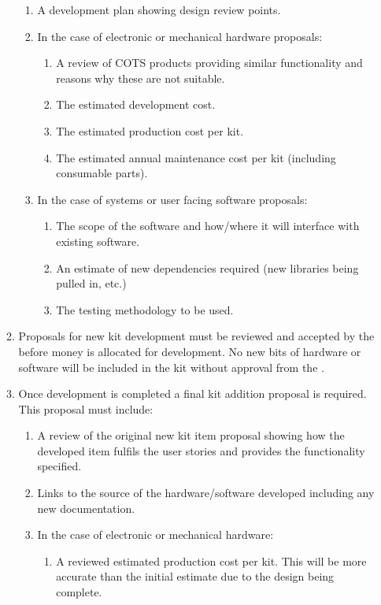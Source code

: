 \begin{enumerate}
\begin{enumerate}
\begin{enumerate}
        \item A development plan showing design review points.
        \item In the case of electronic or mechanical hardware proposals:
          \begin{enumerate}
            \item A review of COTS products providing similar functionality and reasons why these are not suitable.
            \item The estimated development cost.
            \item The estimated production cost per kit.
            \item The estimated annual maintenance cost per kit (including consumable parts).
          \end{enumerate}
        \item In the case of systems or user facing software proposals:
          \begin{enumerate}
            \item The scope of the software and how/where it will interface with existing software.
            \item An estimate of new dependencies required (new libraries being pulled in, etc.)
            \item The testing methodology to be used.
          \end{enumerate}
      \end{enumerate}
    \item Proposals for new kit development must be reviewed and accepted by the  before money is allocated for development. No new bits of hardware or software will be included in the kit without approval from the .
    \item Once development is completed a final kit addition proposal is required. This proposal must include:
      \begin{enumerate}
        \item A review of the original new kit item proposal showing how the developed item fulfils the user stories and provides the functionality specified.
        \item Links to the source of the hardware/software developed including any new documentation.
        \item In the case of electronic or mechanical hardware:
          \begin{enumerate}
            \item A reviewed estimated production cost per kit. This will be more accurate than the initial estimate due to the design being complete.

\end{enumerate}
\end{enumerate}
\end{enumerate}
\end{enumerate}
